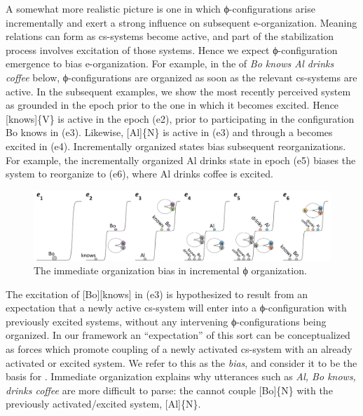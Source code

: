   A somewhat more realistic picture is one in which ϕ-con\-fi\-gu\-ra\-tions arise incrementally and exert a strong influence on subsequent e-or\-ga\-ni\-za\-tion. Meaning relations can form as cs-sys\-tems become active, and part of the stabilization process involves excitation of those systems. Hence we expect ϕ-con\-fi\-gu\-ra\-tion emergence to bias e-or\-ga\-ni\-za\-tion. For example, in the  of \textit{Bo knows Al drinks coffee} below, ϕ-con\-fi\-gu\-ra\-tions are organized as soon as the relevant cs-sys\-tems are active. In the subsequent examples, we show the most recently perceived system as grounded in the epoch prior to the one in which it becomes excited.  Hence [knows]\{V\} is active in the epoch (e2), prior to participating in the configuration {\textbar}Bo knows{\textbar} in (e3). Likewise, [Al]\{N\} is active in (e3) and through a  becomes excited in (e4). Incrementally organized states bias subsequent reorganizations. For example, the incrementally organized {\textbar}Al drinks{\textbar} state in epoch (e5) biases the system to reorganize to (e6), where {\textbar}Al drinks coffee{\textbar} is excited. 

  
\begin{figure}
\includegraphics[width=\textwidth]{figures/Tilsen-img129.png}
\caption{The immediate organization bias in incremental ϕ organization.}
\label{fig:6:10}
\end{figure}
 

  The excitation of [Bo][knows] in (e3) is hypothesized to result from an expectation that a newly active cs-sys\-tem will enter into a ϕ-con\-fi\-gu\-ra\-tion with previously excited systems, without any intervening ϕ-con\-fi\-gu\-ra\-tions being organized. In our framework an “expectation” of this sort can be conceptualized as forces which promote coupling of a newly activated cs-sys\-tem with an already activated or excited system. We refer to this as the \textit{ bias}, and consider it to be the basis for . Immediate organization explains why utterances such as \textit{Al, Bo knows, drinks coffee} are more difficult to parse: the  cannot couple [Bo]\{N\} with the previously activated/excited system, [Al]\{N\}.

